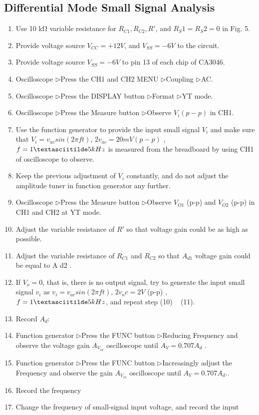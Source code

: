 \documentclass[12pt, a4paper]{article}
\newcommand{\tri}{$\rhd$}
\begin{document}
\subsection{Differential Mode Small Signal Analysis}
\begin{enumerate}[itemsep=0pt]
  \item  Use 10 kΩ variable resistance for $R_{C1}, R_{C2}, R'$, and $R_S1 = R_S2 = 0$ in Fig. 5.
\item  Provide voltage source $V_{CC} = +12V$, and $V_{SS} = −6V$ to the circuit.
\item  Provide voltage source $V_{SS} = −6V$ to pin 13 of each chip of CA3046.
\item Oscilloscope  \tri Press the CH1 and CH2 MENU  \tri  Coupling  \tri  AC.
\item Oscilloscope  \tri Press the DISPLAY button  \tri  Format  \tri  YT mode.
\item Oscilloscope  \tri Press the Measure button  \tri  Observe  $V_i  (p-p)$ in CH1.
\item Use the function generator to provide the input small signal  $V_i$  and
  make sure that  $V_i  = v_{ac} sin(2 \pi ft)$, $2v_{ac} = 20 mV (p-p)$ , $f = 1 \textasciitilde 5kHz$ is
measured from the breadboard by using CH1 of oscilloscope to observe.
\item  Keep the previous adjustment of  $V_i$  constantly, and do not adjust the
amplitude tuner in function generator any further.
\item  Oscilloscope  \tri Press the Measure button  \tri  Observe $V_{O1}$ (p-p) and $V_{O2}$ (p-p)
in CH1 and CH2 at YT mode.
\item  Adjust the variable resistance of $R'$ so that voltage gain could be as high as
possible.
\item  Adjust the variable resistance of $R_{C1}$ and $R_{C2}$ so that $A_{d1}$ voltage gain could
be equal to A d2 .
\item  If  $V_o  = 0$, that is, there is no output signal, try to generate the input small
  signal  $v_i$  as  $v_i  = v_{ac} sin(2\pi ft)$, $2v_ac = 2V$ (p-p) , $f = 1 \textasciitilde 5kHz$, and repeat step
(10) ~ (11).
\item  Record $A_d$:
\item  Function generator  \tri  Press the FUNC button  \tri  Reducing Frequency and
  observe the voltage gain $A_{V_{in}}$ oscilloscope until $A_V = 0.707 A_d$ .
\item  Function generator  \tri  Press the FUNC button  \tri  Increasingly adjust the
  Frequency and observe the gain $A_{V_{in}}$ oscilloscope until $A_V = 0.707 A_d$..
\item  Record the frequency
\item  Change the frequency of small-signal input voltage, and record the input
\end{enumerate}
\end{document}
